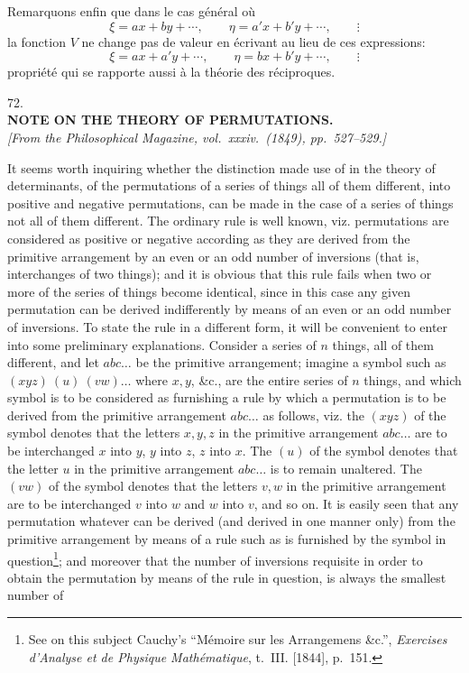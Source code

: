 \documentclass[10pt]{article}
\newcommand{\qedpage}{\vfill\pagebreak}
\begin{document}
Remarquons enfin que dans le cas g\'en\'eral o\`u
\[
\xi=ax+by+\cdots,\qquad
\eta=a'x+b'y+\cdots,\qquad \vdots
\]
la fonction $V$ ne change pas de valeur en \'ecrivant au lieu de ces expressions:
\[
\xi=ax+a'y+\cdots,\qquad
\eta=bx+b'y+\cdots,\qquad \vdots
\]
propri\'et\'e qui se rapporte aussi \`a la th\'eorie des r\'eciproques.
\qedpage


\begin{center}
{\Large 72.}\\[2em]
{\large\bfseries NOTE ON THE THEORY OF PERMUTATIONS.}\\[1.5em]
\textit{[From the Philosophical Magazine, vol.\ xxxiv.\ (1849), pp.~527--529.]}
\end{center}

It seems worth inquiring whether the distinction made use of in the theory of
determinants, of the permutations of a series of things all of them different, into
positive and negative permutations, can be made in the case of a series of things not
all of them different. The ordinary rule is well known, viz. permutations are
considered as positive or negative according as they are derived from the primitive
arrangement by an even or an odd number of inversions (that is, interchanges of two
things); and it is obvious that this rule fails when two or more of the series of
things become identical, since in this case any given permutation can be derived
indifferently by means of an even or an odd number of inversions. To state the rule
in a different form, it will be convenient to enter into some preliminary explanations.
Consider a series of $n$ things, all of them different, and let $abc\ldots$ be the
primitive arrangement; imagine a symbol such as $(xyz)\ (u)\ (vw)\ldots$ where $x,y$,
\&c., are the entire series of $n$ things, and which symbol is to be considered as
furnishing a rule by which a permutation is to be derived from the primitive
arrangement $abc\ldots$ as follows, viz. the $(xyz)$ of the symbol denotes that the
letters $x,y,z$ in the primitive arrangement $abc\ldots$ are to be interchanged $x$
into $y$, $y$ into $z$, $z$ into $x$. The $(u)$ of the symbol denotes that the letter
$u$ in the primitive arrangement $abc\ldots$ is to remain unaltered. The $(vw)$ of the
symbol denotes that the letters $v,w$ in the primitive arrangement are to be
interchanged $v$ into $w$ and $w$ into $v$, and so on. It is easily seen that any
permutation whatever can be derived (and derived in one manner only) from the
primitive arrangement by means of a rule such as is furnished by the symbol in
question\footnote{See on this subject Cauchy's ``M\'emoire sur les Arrangemens
\&c.'', \textit{Exercises d'Analyse et de Physique Math\'ematique}, t.~III. [1844],
p.~151.}; and moreover that the number of inversions requisite in order to obtain
the permutation by means of the rule in question, is always the smallest number of
\qedpage
\end{document}
